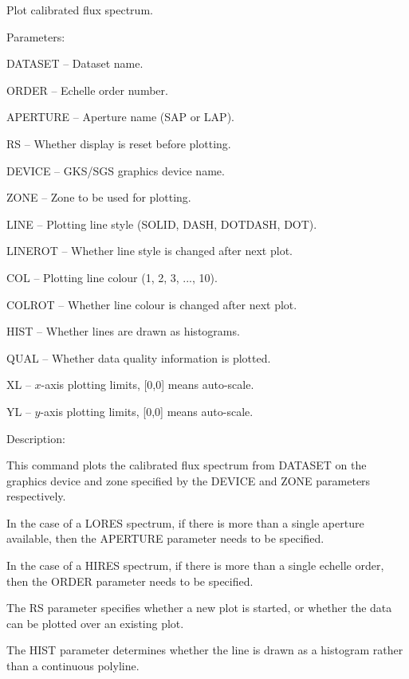 \begin {description}
\item [PLFLUX]
Plot calibrated flux spectrum.

\begin {description}
\item Parameters:

\begin {description}
\item DATASET -- Dataset name.
\item ORDER -- Echelle order number.
\item APERTURE -- Aperture name (SAP or LAP).
\item RS -- Whether display is reset before plotting.
\item DEVICE -- GKS/SGS graphics device name.
\item ZONE -- Zone to be used for plotting.
\item LINE -- Plotting line style (SOLID, DASH, DOTDASH, DOT).
\item LINEROT -- Whether line style is changed after next plot.
\item COL -- Plotting line colour (1, 2, 3, ..., 10).
\item COLROT -- Whether line colour is changed after next plot.
\item HIST -- Whether lines are drawn as histograms.
\item QUAL -- Whether data quality information is plotted.
\item XL -- $x$-axis plotting limits, [0,0] means auto-scale.
\item YL -- $y$-axis plotting limits, [0,0] means auto-scale.
\end {description}

\item Description:

This command plots the calibrated flux spectrum from DATASET
on the graphics device and zone specified by the DEVICE and 
ZONE parameters respectively.

In the case of a LORES spectrum, if there is more than a single
aperture available, then the APERTURE parameter needs to be specified.

In the case of a HIRES spectrum, if there is more than a single
echelle order, then the ORDER parameter needs to be specified.

The RS parameter specifies whether a new plot is started, or whether
the data can be plotted over an existing plot.

The HIST parameter determines whether the line is drawn as a histogram
rather than a continuous polyline.


\end{description}
\end{description}
